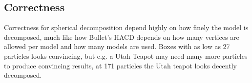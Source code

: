 \subsection{Correctness}
Correctness for spherical decomposition depend highly on how finely the model is
decomposed, much like how Bullet's HACD depends on how many vertices are allowed
per model and how many models are used. Boxes with as low as 27 particles looks convincing, but e.g. a Utah Teapot
may need many more particles to produce convincing results, at 171 particles the
Utah teapot looks decently decomposed.
